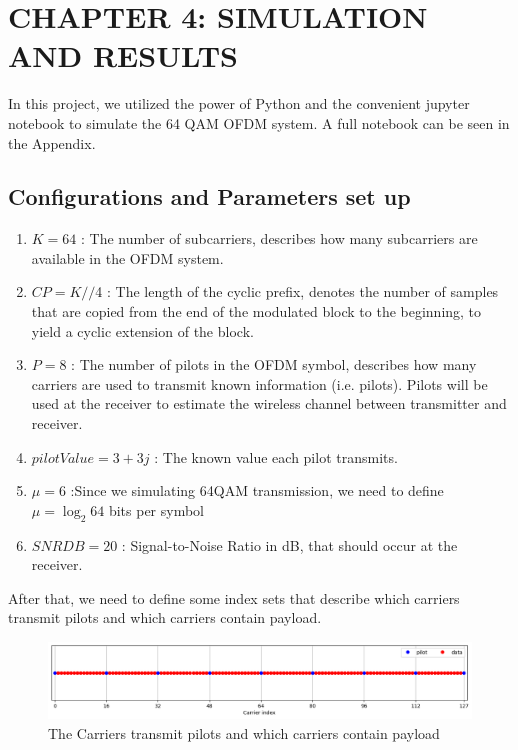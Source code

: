 \section*{CHAPTER 4: SIMULATION AND RESULTS}
\setcounter{section}{4}
\setcounter{subsection}{0}
\setcounter{figure}{0}
\setcounter{table}{0}

In this project, we utilized the power of Python and the convenient jupyter notebook to simulate the 64 QAM OFDM system. A full notebook can be seen in the Appendix.

\subsection{Configurations and Parameters set up}

\begin{enumerate}
    \item $K = 64$ : The number of subcarriers, describes how many subcarriers are available in the OFDM system.
    \item $CP = K//$4 : The length of the cyclic prefix, denotes the number of samples that are copied from the end of the modulated block to the beginning, to yield a cyclic extension of the block.
    \item $P = 8$ : The number of pilots in the OFDM symbol, describes how many carriers are used to transmit known information (i.e. pilots). Pilots will be used at the receiver to estimate the wireless channel between transmitter and receiver.
    \item $pilotValue = 3+3j$ : The known value each pilot transmits.
    \item $\mu = 6$ :Since we simulating 64QAM transmission, we need to define $\mu = \log_{2} 64$ bits per symbol
    \item $SNRDB = 20$ : Signal-to-Noise Ratio in dB, that should occur at the receiver.
\end{enumerate}

After that, we need to define some index sets that describe which carriers transmit pilots and which carriers contain payload.

\begin{figure}[htbp]
    \centering
    \includegraphics[width=\linewidth]{../Source/results/carrier_index}
    \caption{The Carriers transmit pilots and which carriers contain payload}
    \label{carrier_index}
\end{figure}

